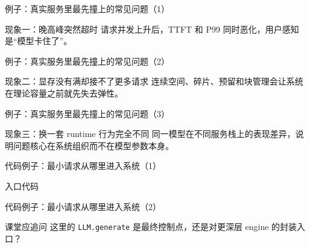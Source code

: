 \begin{frame}{例子：真实服务里最先撞上的常见问题（1）}
  \begin{block}{现象一：晚高峰突然超时}
    请求并发上升后，TTFT 和 P99 同时恶化，用户感知是“模型卡住了”。
  \end{block}
\end{frame}

\begin{frame}{例子：真实服务里最先撞上的常见问题（2）}
  \begin{block}{现象二：显存没有满却接不了更多请求}
    连续空间、碎片、预留和块管理会让系统在理论容量之前就先失去弹性。
  \end{block}
\end{frame}

\begin{frame}{例子：真实服务里最先撞上的常见问题（3）}
  \begin{block}{现象三：换一套 runtime 行为完全不同}
    同一模型在不同服务栈上的表现差异，说明问题核心在系统组织而不在模型参数本身。
  \end{block}
\end{frame}

\begin{frame}{代码例子：最小请求从哪里进入系统（1）}
  \begin{block}{入口代码}
    {\ttfamily\small
    \par
    \par
    \par
    }
  \end{block}
\end{frame}

\begin{frame}{代码例子：最小请求从哪里进入系统（2）}
  \begin{block}{课堂应追问}
    这里的 \texttt{LLM.generate} 是最终控制点，还是对更深层 engine 的封装入口？
  \end{block}
\end{frame}

